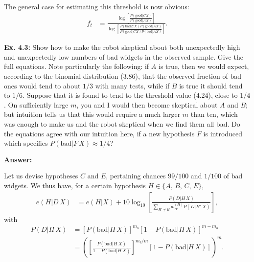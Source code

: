 \documentclass{article}
\begin{document}
The general case for estimating this threshold is now obvious:
\begin{align*}
	f_t&=\frac{\log\left[\frac{P(\text{good}|CX)}{P(\text{good}|AX)}\right]}{\log\left[\frac{P(\text{bad}|CX)P(\text{good}|AX)}{P(\text{good}|CX)P(\text{bad}|AX)}\right]}.
\end{align*}

\textbf{Ex. 4.3: }Show how to make the robot skeptical about both unexpectedly high and unexpectedly low numbers of bad widgets in the observed sample. Give the full equations. Note particularly the following: if $A$ is true, then we would expect, according to the binomial distribution ($3.86$), that the observed fraction of bad ones would tend to about $1/3$ with many tests, while if $B$ is true it should tend to $1/6$. Suppose that it is found to tend to the threshold value ($4.24$), close to $1/4$. On sufficiently large $m$, you and I would then become skeptical about $A$ and $B$; but intuition tells us that this would require a much larger $m$ than ten, which was enough to make us and the robot skeptical when we find them all bad. Do the equations agree with our intuition here, if a new hypothesis $F$ is introduced which specifies $P(\text{bad}|F\,X)\approx1/4$?

\textbf{Answer:}

Let us devise hypotheses $C$ and $E$, pertaining chances $99/100$ and $1/100$ of bad widgets. We thus have, for a certain hypothesis $H\in\{A,\,B,\,C,\,E\}$,
\begin{align*}
	e(H|D\,X)&=e(H|X)+10\log_{10}\left[\frac{P(D|H\,X)}{\sum_{H'\neq H}w_{H'}^{(H)}P(D|H'\,X)}\right],
\end{align*}
with
\begin{align*}
	P(D|H\,X)&=\left[P(\text{bad}|H\,X)\right]^{m_b}\left[1-P(\text{bad}|H\,X)\right]^{m-m_b}\\
		 &=\left(\left[\frac{P(\text{bad}|H\,X)}{1-P(\text{bad}|H\,X)}\right]^{m_b/m}\left[1-P(\text{bad}|H\,X)\right]\right)^m.
\end{align*}
\end{document}
